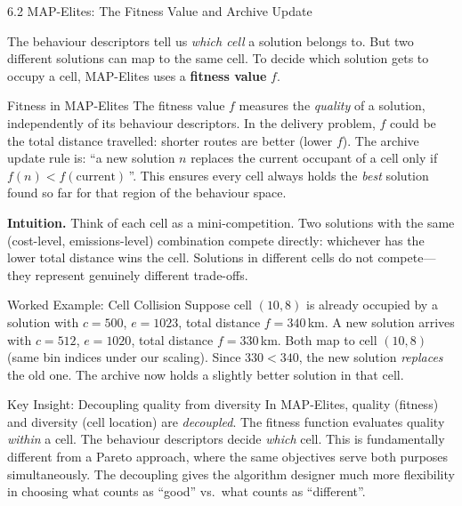 \documentclass[aspectratio=169,10pt]{beamer}
\begin{document}
\begin{frame}[allowframebreaks]{6.2 MAP-Elites: The Fitness Value and Archive Update}

The behaviour descriptors tell us \emph{which cell} a solution belongs
to.
But two different solutions can map to the same cell.
To decide which solution gets to occupy a cell, MAP-Elites uses a
\textbf{fitness value} $f$.

\medskip
\begin{block}{Fitness in MAP-Elites}
The fitness value $f$ measures the \emph{quality} of a solution,
independently of its behaviour descriptors.
In the delivery problem, $f$ could be the total distance travelled:
shorter routes are better (lower $f$).
The archive update rule is: ``a new solution $n$ replaces the current
occupant of a cell only if $f(n) < f(\text{current})$\,''.
This ensures every cell always holds the \emph{best} solution found
so far for that region of the behaviour space.
\end{block}

\medskip
\textbf{Intuition.}
Think of each cell as a mini-competition.
Two solutions with the same (cost-level, emissions-level) combination
compete directly: whichever has the lower total distance wins the cell.
Solutions in different cells do not compete---they represent genuinely
different trade-offs.

\medskip
\begin{exampleblock}{Worked Example: Cell Collision}
Suppose cell $(10, 8)$ is already occupied by a solution with
$c=500$, $e=1023$, total distance $f=340$\,km.
A new solution arrives with $c=512$, $e=1020$, total distance
$f=330$\,km.
Both map to cell $(10, 8)$ (same bin indices under our scaling).
Since $330 < 340$, the new solution \emph{replaces} the old one.
The archive now holds a slightly better solution in that cell.
\end{exampleblock}

\framebreak

\begin{alertblock}{Key Insight: Decoupling quality from diversity}
In MAP-Elites, quality (fitness) and diversity (cell location) are
\emph{decoupled}.
The fitness function evaluates quality \emph{within} a cell.
The behaviour descriptors decide \emph{which} cell.
This is fundamentally different from a Pareto approach, where the same
objectives serve both purposes simultaneously.
The decoupling gives the algorithm designer much more flexibility in
choosing what counts as ``good'' vs.\ what counts as ``different''.
\end{alertblock}

\end{frame}
\end{document}
